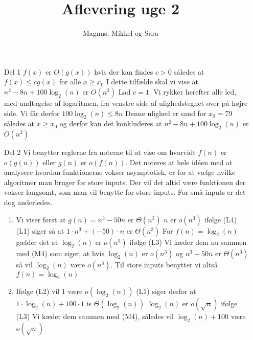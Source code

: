 \documentclass[a4paper]{article}
\title{Aflevering uge 2}
\author{Magnus, Mikkel og Sara}
\begin{document}
\maketitle

\begin{itemize}
    \item[Del 1] $f(x)$ er $O(g(x))$ hvis der kan findes $c>0$ således at $f(x) \leq cg(x) $ for alle $ x\geq x_0$\newline
    I dette tilfælde skal vi vise at $n^2 - 8n +100\log_2(n)$ er $O(n^2)$\newline
    Lad $c=1$. Vi rykker herefter alle led, med undtagelse af logaritmen, fra venstre side af ulighedstegnet over på højre side. Vi får derfor $100\log_2(n) \leq 8n$\newline
    Denne ulighed er sand for $x_{0} = 79$ således at $x\geq x_0$ og derfor kan det konkluderes at $n^2 - 8n + 100\log_2(n)$ er $O(n^2)$
    \item[Del 2] Vi benytter reglerne fra noterne til at vise om hvorvidt $f(n)$ er $o(g(n))$ eller $g(n)$ er $o(f(n))$. Det noteres at hele idéen med at analysere hvordan funktionerne vokser asymptotisk, er for at vælge hvilke algoritmer man bruger for store inputs. Der vil det altid være funktionen der vokser langsomt, som man vil benytte for store inputs. For små inputs er det dog anderledes.
    \begin{enumerate}[label=(\alph*)]
        \item Vi viser først at $g(n) = n^3 - 50n$ er $ \Theta(n^3) $\newline
        $n$ er $o(n^3)$ ifølge (L4)\newline
        (L1) siger så at $1\cdot n^3 + (-50)\cdot n$ er $\Theta (n^3)$\newline
        For $f(n) = \log_2(n)$ gælder det at $\log_2(n)$ er $o(n^3)$ ifølge (L3)\newline
        Vi kæder dem nu sammen med (M4) som siger, at hvis $\log_2(n)$ er $o(n^3)$ og $n^3 - 50n$ er $\Theta (n^3)$ så vil $\log_2(n)$ være $o(n^3)$.\newline
        Til store inputs benytter vi altså $f(n) = \log_2(n)$
        \item 
        Ifølge (L2) vil $1$ være $o(\log_2(n))$\newline
        (L1) siger derfor at $1\cdot \log_2(n) + 100\cdot 1$ is $\Theta (\log_2(n))$\newline
        $\log_2(n)$ er $o(\sqrt n)$ ifølge (L3)\newline
        Vi kæder dem sammen med (M4), således vil $\log_2(n) + 100$ være $o(\sqrt n)$\newline

\end{enumerate}
\end{itemize}
\end{document}
